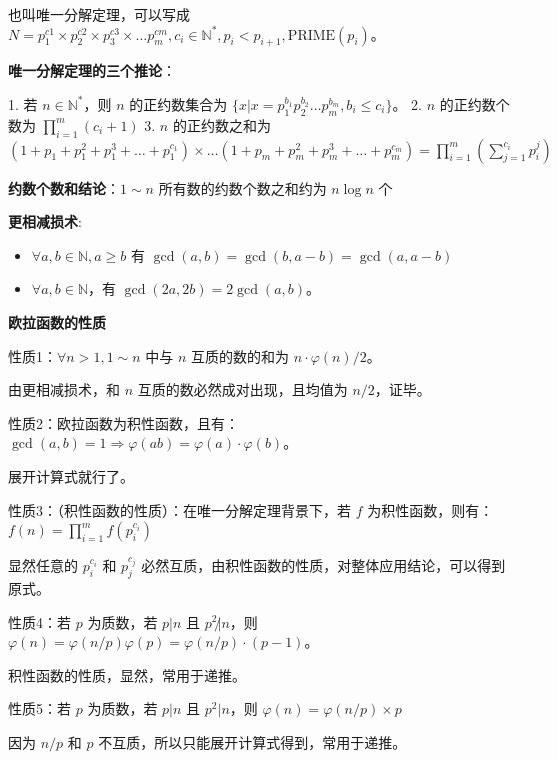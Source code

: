 \documentclass[titlepage, a4paper]{article}
\begin{document}
\begin{multicols}{2}
\begin{spacing}{0.6}
			 		也叫唯一分解定理，可以写成 $N = p_1^{c1}\times p_2^{c2}\times p_3^{c3}\times \dots p_m^{cm}, c_i \in \mathbb{N}^*, p_i < p_{i + 1},\text{PRIME}(p_i)$。
			 	
			 		\textbf{唯一分解定理的三个推论}：
			 		
			 		1. 若 $n \in \mathbb{N}^*$，则 $n$ 的正约数集合为 $\{x | x = p_1^{b_1}p_2^{b_2}\dots p_m^{b_m},b_i \le 	c_i\}$。
			 		2. $n$ 的正约数个数为 $\prod\limits_{i = 1}^m(c_i+ 1)$
			 		3. $n$ 的正约数之和为 $(1+p_1+p_1^2+p_1^3+\dots +p_1^{c_1})\times\dots(1+p_m+p_m^2+p_m^3+\dots +p_m^{c_m}) = \prod\limits_{i = 1}^m(\sum\limits_{j = 1}^{c_i} p_i^{j})$
			 	
				 	\textbf{约数个数和结论}：$1\sim n$ 所有数的约数个数之和约为 $n\log n$ 个
				 	
				 	\textbf{更相减损术}:
				 	\begin{itemize}
				 		\item $\forall a,b \in \mathbb{N},a\ge b$ 有 $\gcd(a,b) = \gcd(b, a-b) = \gcd(a, a-b)$
				 		\item $\forall a,b \in \mathbb{N}$，有 $\gcd(2a,2b) = 2\gcd(a,b)$。
				 	\end{itemize}
			 	
				 	\textbf{欧拉函数的性质}
				 	
				 	性质1：$\forall n > 1, 1\sim n$ 中与 $n$ 互质的数的和为 $n\cdot\varphi(n)/2$。
				 	
				 	由更相减损术，和 $n$ 互质的数必然成对出现，且均值为 $n/2$，证毕。
				 	
				 	性质2：欧拉函数为积性函数，且有：$\gcd(a,b)=1\Rightarrow \varphi(ab)=\varphi(a)\cdot\varphi(b)$。
				 	
				 	展开计算式就行了。
				 	
				 	性质3：（积性函数的性质）：在唯一分解定理背景下，若 $f$ 为积性函数，则有：$f(n)=\prod\limits_{i=1}^mf(p_i^{c_i})$
				 	
				 	显然任意的 $p_i^{c_i}$ 和 $p_j^{c_j}$ 必然互质，由积性函数的性质，对整体应用结论，可以得到原式。
				 	
				 	性质4：若 $p$ 为质数，若 $p|n$ 且 $p^2\not|n$，则 $\varphi(n)=\varphi(n/p)\varphi(p)=\varphi(n/p)\cdot(p-1)$。
				 	
				 	积性函数的性质，显然，常用于递推。
				 	
				 	性质5：若 $p$ 为质数，若 $p|n$ 且 $p^2|n$，则 $\varphi(n)= \varphi(n/p)\times p$
				 	
				 	因为 $n/p$ 和 $p$ 不互质，所以只能展开计算式得到，常用于递推。
				 	

\end{spacing}
\end{multicols}
\end{document}
